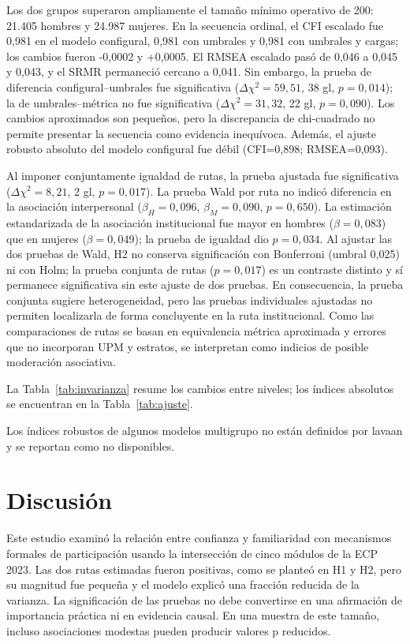 \documentclass[11pt,letterpaper]{article}
\begin{document}
Los dos grupos superaron ampliamente el tamaño mínimo operativo de 200: 21.405 hombres y 24.987 mujeres. En la secuencia ordinal, el CFI escalado fue 0{,}981 en el modelo configural, 0{,}981 con umbrales y 0{,}981 con umbrales y cargas; los cambios fueron -0{,}0002 y +0{,}0005. El RMSEA escalado pasó de 0{,}046 a 0{,}045 y 0{,}043, y el SRMR permaneció cercano a 0{,}041. Sin embargo, la prueba de diferencia configural--umbrales fue significativa (\(\Delta\chi^2=59{,}51\), 38 gl, \(p=0{,}014\)); la de umbrales--métrica no fue significativa (\(\Delta\chi^2=31{,}32\), 22 gl, \(p=0{,}090\)). Los cambios aproximados son pequeños, pero la discrepancia de chi-cuadrado no permite presentar la secuencia como evidencia inequívoca. Además, el ajuste robusto absoluto del modelo configural fue débil (CFI=0{,}898; RMSEA=0{,}093).

Al imponer conjuntamente igualdad de rutas, la prueba ajustada fue significativa (\(\Delta\chi^2=8{,}21\), 2 gl, \(p=0{,}017\)). La prueba Wald por ruta no indicó diferencia en la asociación interpersonal (\(\beta_{H}=0{,}096\), \(\beta_{M}=0{,}090\), \(p=0{,}650\)). La estimación estandarizada de la asociación institucional fue mayor en hombres (\(\beta=0{,}083\)) que en mujeres (\(\beta=0{,}049\)); la prueba de igualdad dio \(p=0{,}034\). Al ajustar las dos pruebas de Wald, H2 no conserva significación con Bonferroni (umbral 0{,}025) ni con Holm; la prueba conjunta de rutas (\(p=0{,}017\)) es un contraste distinto y sí permanece significativa sin este ajuste de dos pruebas. En consecuencia, la prueba conjunta sugiere heterogeneidad, pero las pruebas individuales ajustadas no permiten localizarla de forma concluyente en la ruta institucional. Como las comparaciones de rutas se basan en equivalencia métrica aproximada y errores que no incorporan UPM y estratos, se interpretan como indicios de posible moderación asociativa.

La Tabla~\ref{tab:invarianza} resume los cambios entre niveles; los índices absolutos se encuentran en la Tabla~\ref{tab:ajuste}.

Los índices robustos de algunos modelos multigrupo no están definidos por lavaan y se reportan como no disponibles.



\section{Discusión}
\label{sec:discusion}

Este estudio examinó la relación entre confianza y familiaridad con mecanismos formales de participación usando la intersección de cinco módulos de la ECP 2023. Las dos rutas estimadas fueron positivas, como se planteó en H1 y H2, pero su magnitud fue pequeña y el modelo explicó una fracción reducida de la varianza. La significación de las pruebas no debe convertirse en una afirmación de importancia práctica ni en evidencia causal. En una muestra de este tamaño, incluso asociaciones modestas pueden producir valores p reducidos.
\end{document}
